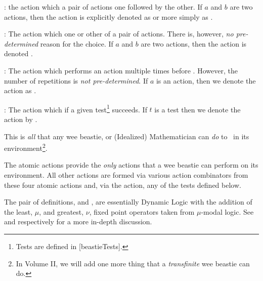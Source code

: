 \stopitemize

\stopitemize

\item {}

\startitemize[n]

\item {}: the action which  a pair of 
actions one followed by the other. If $a$ and $b$ are two actions, then 
the  action is explicitly denoted as 
 or more simply as . 

\item {}: The action which  
one or other of a pair of actions. There is, however, \emph{no 
pre-determined} reason for the choice. If $a$ and $b$ are two actions, 
then the  action is denoted 
. 

\item {}: The action which performs an action 
multiple times before . However, the number of 
repetitions is \emph{not pre-determined}. If $a$ is an action, then we 
denote the  action as 
. 

\item {}: The action which  if a given 
test\footnote{Tests are defined in [beastieTests].} 
succeeds. If $t$ is a test then we denote the  action by 
. 

\stopitemize

\stopitemize

\noindent This is \emph{all} that any wee beastie, or (Idealized) 
Mathematician can \emph{do} to \lols\ in its environment\footnote{In 
Volume II, we will add one more thing that a \emph{transfinite} wee 
beastie can do.}. 

\stopDefinition

\startMMundi

The atomic actions provide the \emph{only} actions that a wee beastie can 
perform \emph{} on its environment. All other actions are 
formed via various action combinators from these four atomic actions and, 
via the  action, any of the tests defined below. 

The pair of definitions, \in[beastieActions] and \in[beastieTests], are 
essentially Dynamic Logic with the addition of the least, $\mu$, and 
greatest, $\nu$, fixed point operators taken from $\mu$-modal logic. See 
\cite{harelKozenTiuryn2000dynamicLogic} and 
\cite{demriGorankoLange2016temporalLogics} respectively for a more 
in-depth discussion. 

